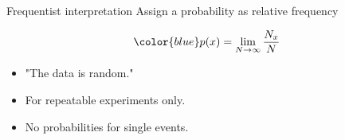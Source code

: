 \documentclass[
aspectratio=169,
14pt,
professionalfonts
]{beamer}
\begin{document}
\begin{frame}{Frequentist interpretation}
    Assign a probability as relative frequency

        $$ \color{blue}
        p(x) = \lim_{N\to\infty} \frac{N_x}{N}
        $$

        \begin{itemize}
            \item "The data is random."
            \item For repeatable experiments only.
            \item No probabilities for single events.
        \end{itemize}
\end{frame}
\end{document}
